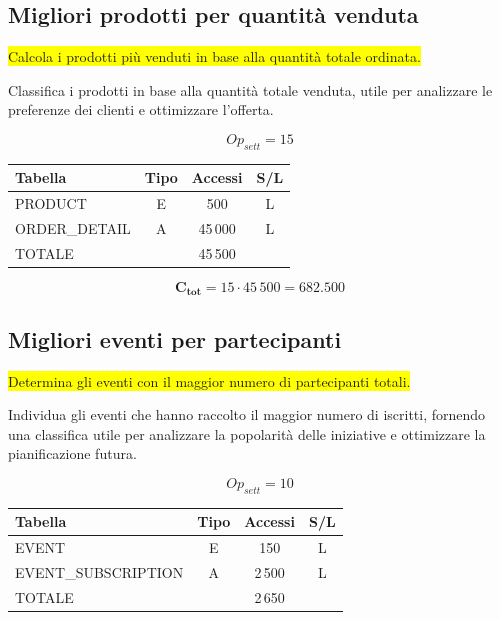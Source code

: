 \documentclass[a4paper,12pt]{report}
\begin{document}
\subsection*{Migliori prodotti per quantità venduta} \label{op2}
\colorbox{yellow}{Calcola i prodotti più venduti in base alla
quantità totale ordinata.}

Classifica i prodotti in base alla quantità totale venduta, utile per
analizzare le preferenze dei clienti e ottimizzare l'offerta.

$$Op_{sett} = 15$$

\begin{table}[H]
  \centering
  \small
  \renewcommand{\arraystretch}{1.15}
  \begin{tabularx}{0.9\textwidth}{|X|c|c|c|}
    \hline
    \rowcolor{gray!20}
    \textbf{Tabella} & \textbf{Tipo} & \textbf{Accessi} & \textbf{S/L} \\
    \hline
    PRODUCT & E & 500 & L \\
    ORDER\_DETAIL & A & 45\,000 & L \\
    \hline
    \rowcolor{gray!20}
    TOTALE & & 45\,500 & \\
    \hline
  \end{tabularx}
  \vspace{-1em}
\end{table}

$$\mathbf{C_{tot}} = 15 \cdot 45\,500 = \mathbf{682.500}$$

\subsection*{Migliori eventi per partecipanti} \label{op3}
\colorbox{yellow}{Determina gli eventi con il maggior numero di
partecipanti totali.}

Individua gli eventi che hanno raccolto il maggior numero di
iscritti, fornendo una classifica utile per analizzare la popolarità
delle iniziative e ottimizzare la pianificazione futura.

$$Op_{sett} = 10$$

\begin{table}[H]
  \centering
  \small
  \renewcommand{\arraystretch}{1.15}
  \begin{tabularx}{0.9\textwidth}{|X|c|c|c|}
    \hline
    \rowcolor{gray!20}
    \textbf{Tabella} & \textbf{Tipo} & \textbf{Accessi} & \textbf{S/L} \\
    \hline
    EVENT & E & 150 & L \\
    EVENT\_SUBSCRIPTION & A & 2\,500 & L \\
    \hline
    \rowcolor{gray!20}
    TOTALE & & 2\,650 & \\
    \hline
  \end{tabularx}
  \vspace{-1em}
\end{table}
\end{document}
